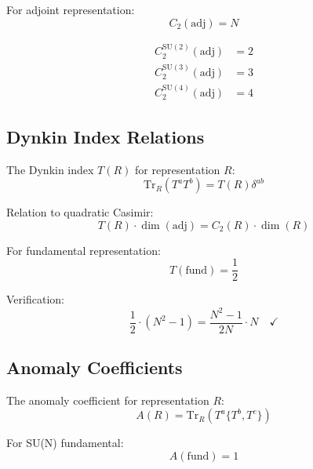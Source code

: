 \documentclass[11pt,a4paper]{article}
\theoremstyle{definition}
\begin{document}
For adjoint representation:
\begin{equation}
  \label{eq:casimir-adj}
  C_2(\text{adj}) = N
\end{equation}

\begin{align}
  \label{eq:casimir-adj-values}
  C_2^{\text{SU}(2)}(\text{adj}) &= 2 \\
  C_2^{\text{SU}(3)}(\text{adj}) &= 3 \\
  C_2^{\text{SU}(4)}(\text{adj}) &= 4
\end{align}

\subsection{Dynkin Index Relations}
\label{subsec:dynkin}

The Dynkin index $T(R)$ for representation $R$:
\begin{equation}
  \label{eq:dynkin-def}
  \text{Tr}_R(T^a T^b) = T(R) \delta^{ab}
\end{equation}

Relation to quadratic Casimir:
\begin{equation}
  \label{eq:dynkin-casimir}
  T(R) \cdot \dim(\text{adj}) = C_2(R) \cdot \dim(R)
\end{equation}

For fundamental representation:
\begin{equation}
  \label{eq:dynkin-fund}
  T(\text{fund}) = \frac{1}{2}
\end{equation}

Verification:
\begin{equation}
  \label{eq:dynkin-verify}
  \frac{1}{2} \cdot (N^2 - 1) = \frac{N^2 - 1}{2N} \cdot N \quad \checkmark
\end{equation}

\subsection{Anomaly Coefficients}
\label{subsec:anomaly-coeff}

The anomaly coefficient for representation $R$:
\begin{equation}
  \label{eq:anomaly-def}
  A(R) = \text{Tr}_R(T^a \{T^b, T^c\})
\end{equation}

For SU(N) fundamental:
\begin{equation}
  \label{eq:anomaly-fund}
  A(\text{fund}) = 1
\end{equation}
\end{document}
